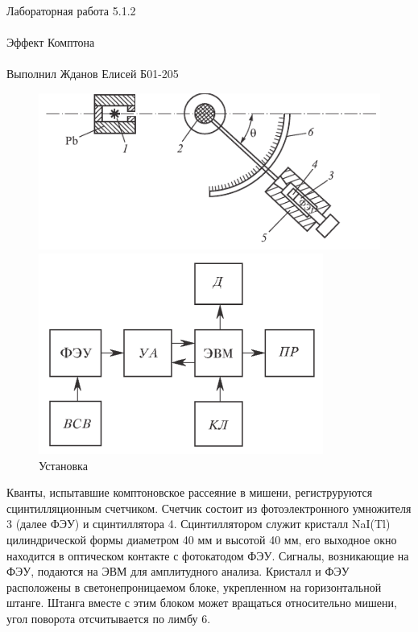 \documentclass{astroedu-lab}
\begin{document}
\begin{problem}{\huge Лабораторная работа 5.1.2\\\\Эффект Комптона\\\\Выполнил Жданов Елисей Б01-205}
\begin{figure}[h] %
    \centering %
    \begin{minipage}[b]{0.45\textwidth}
        \centering
        \includegraphics[width=\textwidth]{ustanovka1.pdf} %
        \caption{} %
    \end{minipage}
    \hfill
    \begin{minipage}[b]{0.45\textwidth}
        \centering
        \includegraphics[width=\textwidth]{ustanovka2.pdf} %
        \caption{}
    \end{minipage}
    \caption{Установка}
\end{figure}

	
	Кванты, испытавшие комптоновское рассеяние в мишени, региструруются сцинтилляционным счетчиком. Счетчик состоит из фотоэлектронного умножителя 3 (далее ФЭУ) и сцинтиллятора 4. Сцинтиллятором служит кристалл NaI(Tl) цилиндрической формы диаметром 40 мм и высотой 40 мм, его выходное окно находится в оптическом контакте с фотокатодом ФЭУ. Сигналы, возникающие на ФЭУ, подаются на ЭВМ для амплитудного анализа. Кристалл и ФЭУ расположены в светонепроницаемом блоке, укрепленном на горизонтальной штанге. Штанга вместе с этим блоком может вращаться относительно мишени, угол поворота отсчитывается по лимбу 6.
	

\end{problem}
\end{document}

